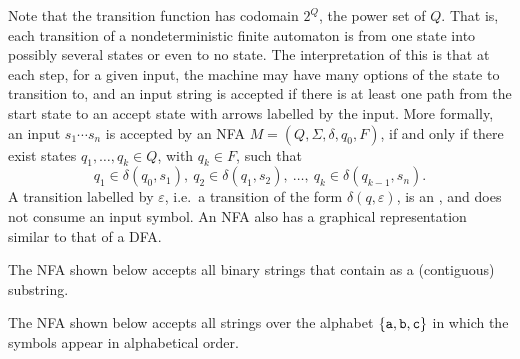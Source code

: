 Note that the transition function has codomain $2^Q$, the power set of $Q$. That is, each transition of a nondeterministic finite automaton is from one state into possibly several states or even to no state. The interpretation of this is that at each step, for a given input, the machine may have many options of the state to transition to, and an input string is accepted if there is at least one path from the start state to an accept state with arrows labelled by the input. More formally, an input $s_1 \cdots s_n$ is accepted by an NFA $M = (Q, \Sigma, \delta, q_0, F)$, if and only if there exist states $q_1, \ldots, q_k \in Q$, with $q_k \in F$, such that
\begin{equation*}
q_1 \in \delta(q_0, s_1),~ q_2 \in \delta(q_1, s_2),~ \ldots,~ q_k \in \delta(q_{k-1}, s_n).
\end{equation*}
A transition labelled by $\varepsilon$, i.e.\ a transition of the form $\delta(q, \varepsilon)$, is an , and does not consume an input symbol. An NFA also has a graphical representation similar to that of a DFA.

\begin{Example}\label{ex:NFAContains110}
The NFA shown below accepts all binary strings that contain  as a (contiguous) substring.
\begin{center}
\end{center}
\end{Example}

\begin{Example}\label{ex:NFAabcAlphabetical}
The NFA shown below accepts all strings over the alphabet $\{\texttt a, \texttt b, \texttt c\}$ in which the symbols appear in alphabetical order.
\begin{center}
\end{center}
\end{Example}

